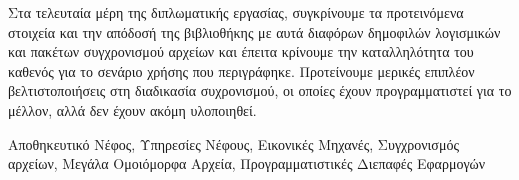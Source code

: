 \begin{abstractgr}
  Στα τελευταία μέρη της διπλωματικής εργασίας, συγκρίνουμε τα προτεινόμενα στοιχεία και την απόδοσή της βιβλιοθήκης με αυτά διαφόρων δημοφιλών λογισμικών και πακέτων συγχρονισμού αρχείων και έπειτα κρίνουμε την καταλληλότητα του καθενός για το σενάριο χρήσης που περιγράφηκε. Προτείνουμε μερικές επιπλέον βελτιστοποιήσεις στη διαδικασία συχρονισμού, οι οποίες έχουν προγραμματιστεί για το μέλλον, αλλά δεν έχουν ακόμη υλοποιηθεί.

\begin{keywordsgr}
    Αποθηκευτικό Νέφος, Υπηρεσίες Νέφους, Εικονικές Μηχανές, Συγχρονισμός αρχείων, Μεγάλα Ομοιόμορφα Αρχεία, Προγραμματιστικές Διεπαφές Εφαρμογών
\end{keywordsgr}
\end{abstractgr}

\onehalfspacing
